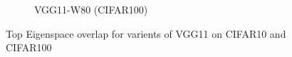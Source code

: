 \begin{figure}[H]
\begin{subfigure}[b]{0.48\textwidth}
        \caption{VGG11-W80 (CIFAR100)}
        \label{fig:app_adexp_cifar100_vgg80}
    \end{subfigure}
    \captionsetup{justification=centering}
    \caption{Top Eigenspace overlap for varients of VGG11 on CIFAR10 and CIFAR100}
    \label{fig:app_adexp_vgg}
\end{figure}


